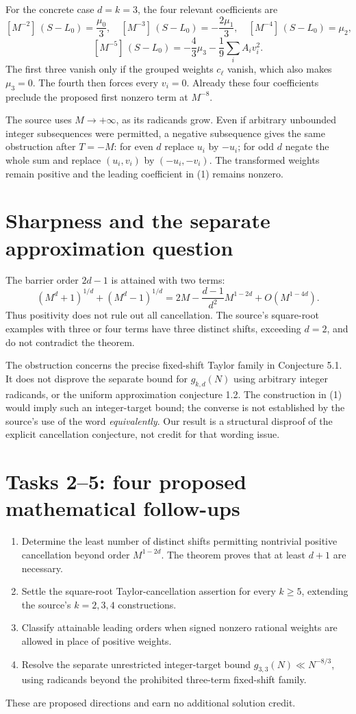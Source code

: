 \documentclass[11pt]{article}
\begin{document}
For the concrete case \(d=k=3\), the four relevant coefficients are
\[
 [M^{-2}]\,(S-L_0)=\frac{\mu_0}{3},\quad
 [M^{-3}]\,(S-L_0)=-\frac{2\mu_1}{3},\quad
 [M^{-4}]\,(S-L_0)=\mu_2,
\]
\[
 [M^{-5}]\,(S-L_0)
       =-\frac43\mu_3-\frac19\sum_i A_i v_i^2.
\]
The first three vanish only if the grouped weights \(c_\ell\)
vanish, which also makes \(\mu_3=0\). The fourth then forces
every \(v_i=0\). Already these four coefficients preclude the
proposed first nonzero term at \(M^{-8}\).

The source uses \(M\to+\infty\), as its radicands grow.
Even if arbitrary unbounded integer subsequences were permitted,
a negative subsequence gives the same obstruction after \(T=-M\):
for even \(d\) replace \(u_i\) by \(-u_i\); for odd \(d\) negate
the whole sum and replace \((u_i,v_i)\) by \((-u_i,-v_i)\).
The transformed weights remain positive and the leading coefficient
in (1) remains nonzero.

\section*{Sharpness and the separate approximation question}
The barrier order \(2d-1\) is attained with two terms:
\[
 (M^d+1)^{1/d}+(M^d-1)^{1/d}
 =2M-\frac{d-1}{d^2}M^{1-2d}+O(M^{1-4d}).               \tag{7}
\]
Thus positivity does not rule out all cancellation.
The source's square-root examples with three or four terms have
three distinct shifts, exceeding \(d=2\), and do not contradict
the theorem.

The obstruction concerns the precise fixed-shift Taylor family in
Conjecture 5.1. It does not disprove the separate bound for
\(g_{k,d}(N)\) using arbitrary integer radicands, or the
uniform approximation conjecture 1.2. The construction in (1)
would imply such an integer-target bound; the converse is not
established by the source's use of the word \emph{equivalently}.
Our result is a structural disproof of the explicit cancellation
conjecture, not credit for that wording issue.

\section*{Tasks 2--5: four proposed mathematical follow-ups}
\begin{enumerate}[label=\textbf{Task \arabic*:},start=2,leftmargin=*]
\item Determine the least number of distinct shifts permitting
nontrivial positive cancellation beyond order \(M^{1-2d}\).
The theorem proves that at least \(d+1\) are necessary.
\item Settle the square-root Taylor-cancellation assertion for
every \(k\geq5\), extending the source's \(k=2,3,4\) constructions.
\item Classify attainable leading orders when signed nonzero
rational weights are allowed in place of positive weights.
\item Resolve the separate unrestricted integer-target bound
\(g_{3,3}(N)\ll N^{-8/3}\), using radicands beyond the prohibited
three-term fixed-shift family.
\end{enumerate}
These are proposed directions and earn no additional solution credit.
\end{document}

